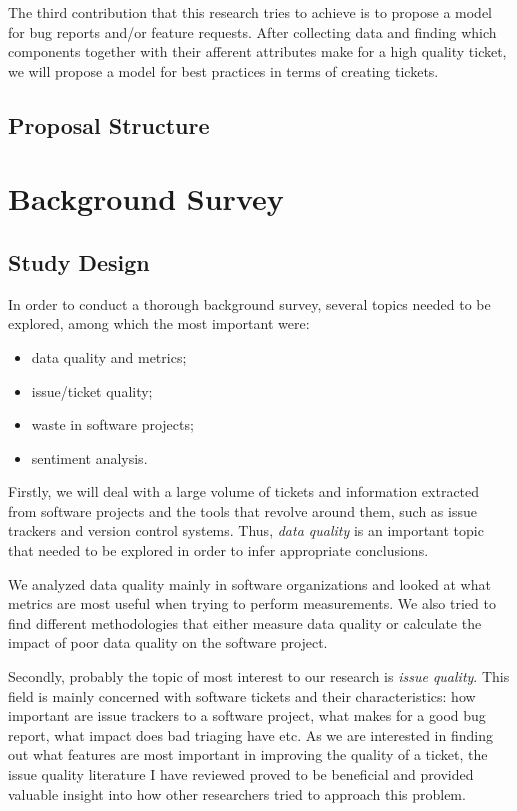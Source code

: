 \documentclass{mprop}
\begin{document}
The third contribution that this research tries to achieve is to
propose a model for bug reports and/or feature requests. After collecting
data and finding which components together with their afferent attributes
make for a high quality ticket, we will propose a model for best practices
in terms of creating tickets.

\subsection{Proposal Structure}




\section{Background Survey}

\subsection{Study Design}

In order to conduct a thorough background survey, several topics needed to be 
explored, among which the most important were:
  \begin{itemize}
    \item data quality and metrics;
    \item issue/ticket quality;
    \item waste in software projects;
    \item sentiment analysis.
  \end{itemize}

Firstly, we will deal with a large volume of tickets and information extracted 
from software projects and the tools that revolve around them, such as issue 
trackers and version control systems. Thus, \emph{data quality} is an important 
topic that needed to be explored in order to infer appropriate conclusions. 

We analyzed data quality mainly in software organizations and looked at what metrics
are most useful when trying to perform measurements. We also tried to find different
methodologies that either measure data quality or calculate the impact of poor data
quality on the software project. 

Secondly, probably the topic of most interest to our research is \emph{issue quality}.
This field is mainly concerned with software tickets and their characteristics: how
important are issue trackers to a software project, what makes for a good bug report,
what impact does bad triaging have etc. As we are interested in finding out what
features are most important in improving the quality of a ticket, the issue quality
literature I have reviewed proved to be beneficial and provided valuable insight into
how other researchers tried to approach this problem.
\end{document}
